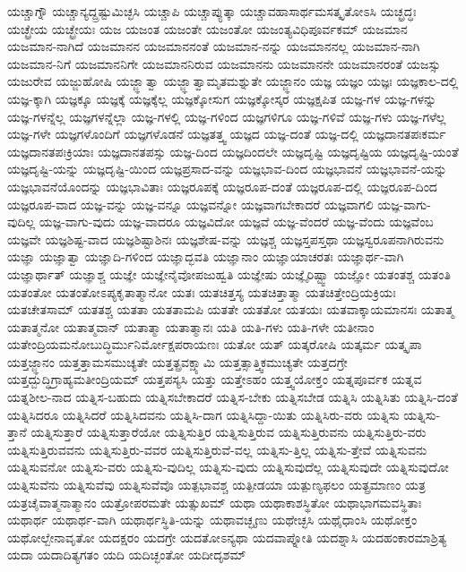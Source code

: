 {ಯಚ್ಚಾಗ್ನೌ
ಯಚ್ಚಾನ್ಯದ್ದ್ರಷ್ಟುಮಿಚ್ಛಸಿ
ಯಚ್ಚಾಪಿ
ಯಚ್ಚಾಪ್ಯುತ್ಕಾ
ಯಚ್ಚಾವಹಾಸಾರ್ಥಮಸತ್ಕೃತೋಽಸಿ
ಯಚ್ಛ್ರದ್ಧಃ
ಯಚ್ಛ್ರೇಯ
ಯಚ್ಛ್ರೇಯಃ
ಯಜ
ಯಜಂತ
ಯಜಂತೇ
ಯಜಂತೋ
ಯಜಂತ್ಯವಿಧಿಪೂರ್ವಕಮ್
ಯಜಮಾನ
ಯಜಮಾನ-ನಾಗಿದೆ
ಯಜಮಾನನ
ಯಜಮಾನನಂತೆ
ಯಜಮಾನ-ನನ್ನು
ಯಜಮಾನನಲ್ಲ
ಯಜಮಾನ-ನಾಗಿ
ಯಜಮಾನ-ನಿಗೆ
ಯಜಮಾನನಿಗೇ
ಯಜಮಾನನಿರುವ
ಯಜಮಾನನು
ಯಜಮಾನನೇ
ಯಜಮಾನರಂತೆ
ಯಜಸ್ಸು
ಯಜುರೇವ
ಯಜ್ಜುಹೋಷಿ
ಯಜ್ಜ್ಞಾತ್ವಾ
ಯಜ್ಜ್ಞಾತ್ವಾಮೃತಮಶ್ನುತೇ
ಯಜ್ಜ್ಞಾನಂ
ಯಜ್ಞ
ಯಜ್ಞಂ
ಯಜ್ಞಃ
ಯಜ್ಞಕಾಲ-ದಲ್ಲಿ
ಯಜ್ಞ-ಕ್ಕಾಗಿ
ಯಜ್ಞಕ್ಕೂ
ಯಜ್ಞಕ್ಕೆ
ಯಜ್ಞಕ್ಕೆಲ್ಲ
ಯಜ್ಞಕ್ಕೋಸುಗ
ಯಜ್ಞಕ್ಕೋಸ್ಕರ
ಯಜ್ಞಕ್ಷಪಿತ
ಯಜ್ಞ-ಗಳ
ಯಜ್ಞ-ಗಳನ್ನು
ಯಜ್ಞ-ಗಳನ್ನೆಲ್ಲ
ಯಜ್ಞಗಳನ್ನೆಲ್ಲಾ
ಯಜ್ಞ-ಗಳಲ್ಲಿ
ಯಜ್ಞ-ಗಳಿಂದ
ಯಜ್ಞಗಳಿಗೂ
ಯಜ್ಞ-ಗಳಿವೆ
ಯಜ್ಞ-ಗಳು
ಯಜ್ಞ-ಗಳೆಲ್ಲ
ಯಜ್ಞ-ಗಳೇ
ಯಜ್ಞಗಳೊಂದಿಗೆ
ಯಜ್ಞಗಳೊಡನೆ
ಯಜ್ಞತತ್ತ್ವ
ಯಜ್ಞದ
ಯಜ್ಞ-ದಂತೆ
ಯಜ್ಞ-ದಲ್ಲಿ
ಯಜ್ಞದಾನತಪಃಕರ್ಮ
ಯಜ್ಞದಾನತಪಃಕ್ರಿಯಾಃ
ಯಜ್ಞದಾನತಪಸ್ಸು
ಯಜ್ಞ-ದಿಂದ
ಯಜ್ಞದಿಂದಲೇ
ಯಜ್ಞದೃಷ್ಟಿ
ಯಜ್ಞದೃಷ್ಟಿಯ
ಯಜ್ಞದೃಷ್ಟಿ-ಯಂತೆ
ಯಜ್ಞದೃಷ್ಟಿ-ಯನ್ನು
ಯಜ್ಞದೃಷ್ಟಿ-ಯಿಂದ
ಯಜ್ಞಪ್ರಸಾದ-ವನ್ನು
ಯಜ್ಞಭಾವ-ದಿಂದ
ಯಜ್ಞಭಾವನೆ
ಯಜ್ಞಭಾವನೆ-ಯನ್ನು
ಯಜ್ಞಭಾವನೆಯೊಂದನ್ನು
ಯಜ್ಞಭಾವಿತಾಃ
ಯಜ್ಞರೂಪಕ್ಕೆ
ಯಜ್ಞರೂಪ-ದಂತೆ
ಯಜ್ಞರೂಪ-ದಲ್ಲಿ
ಯಜ್ಞರೂಪ-ದಿಂದ
ಯಜ್ಞರೂಪ-ವಾದ
ಯಜ್ಞ-ವನ್ನು
ಯಜ್ಞ-ವನ್ನೂ
ಯಜ್ಞವನ್ನೋ
ಯಜ್ಞವಾಗಬೇಕಾದರೆ
ಯಜ್ಞವಾಗಲಿ
ಯಜ್ಞ-ವಾಗು-ವುದಿಲ್ಲ
ಯಜ್ಞ-ವಾಗು-ವುದು
ಯಜ್ಞ-ವಾದರೂ
ಯಜ್ಞವಿದೋ
ಯಜ್ಞವೆ
ಯಜ್ಞ-ವೆಂದರೆ
ಯಜ್ಞ-ವೆಂದು
ಯಜ್ಞವೆಂಬ
ಯಜ್ಞವೇ
ಯಜ್ಞಶಿಷ್ಟ-ವಾದ
ಯಜ್ಞಶಿಷ್ಟಾಶಿನಃ
ಯಜ್ಞಶೇಷ-ವನ್ನು
ಯಜ್ಞಶ್ಚ
ಯಜ್ಞಸ್ತಪಸ್ತಥಾ
ಯಜ್ಞಸ್ವರೂಪನಾಗಿರುವನು
ಯಜ್ಞಾ
ಯಜ್ಞಾತ್ವಾ
ಯಜ್ಞಾದಿ-ಗಳಿಂದ
ಯಜ್ಞಾದ್ಭವತಿ
ಯಜ್ಞಾನಾಂ
ಯಜ್ಞಾಯಾಚರತಃ
ಯಜ್ಞಾರ್ಥ-ವಾಗಿ
ಯಜ್ಞಾರ್ಥಾತ್
ಯಜ್ಞಾಶ್ಚ
ಯಜ್ಞೇ
ಯಜ್ಞೇನೈವೋಪಜುಹ್ವತಿ
ಯಜ್ಞೇಷು
ಯಜ್ಞೈರಿಷ್ಟ್ವಾ
ಯಜ್ಞೋ
ಯತಂತಶ್ಚ
ಯತಂತಿ
ಯತಂತೋ
ಯತಂತೋಽಪ್ಯಕೃತಾತ್ಮಾನೋ
ಯತಃ
ಯತಚಿತ್ತಸ್ಯ
ಯತಚಿತ್ತಾತ್ಮಾ
ಯತಚಿತ್ತೇಂದ್ರಿಯಕ್ರಿಯಃ
ಯತಚೇತಸಾಮ್
ಯತತಶ್ಚ
ಯತತಾ
ಯತತಾಮಪಿ
ಯತತೇ
ಯತತೋ
ಯತಯಃ
ಯತವಾಕ್ಕಾಯಮಾನಸಃ
ಯತಾತ್ಮ
ಯತಾತ್ಮನೋ
ಯತಾತ್ಮವಾನ್
ಯತಾತ್ಮಾ
ಯತಾತ್ಮಾನಃ
ಯತಿ
ಯತಿ-ಗಳು
ಯತಿ-ಗಳೇ
ಯತೀನಾಂ
ಯತೇಂದ್ರಿಯಮನೋಬುದ್ಧಿರ್ಮುನಿರ್ಮೋಕ್ಷಪರಾಯಣಃ
ಯತೋ
ಯತ್
ಯತ್ಕರೋಷಿ
ಯತ್ಕರ್ಮ
ಯತ್ಕೃಪಾ
ಯತ್ತಜ್ಜ್ಞಾನಂ
ಯತ್ತತ್ತಾಮಸಮುಚ್ಯತೇ
ಯತ್ತತ್ಪ್ರವಕ್ಷ್ಯಾಮಿ
ಯತ್ತತ್ಸಾತ್ತ್ವಿಕಮುಚ್ಯತೇ
ಯತ್ತದಗ್ರೇ
ಯತ್ತದ್ಬುದ್ಧಿಗ್ರಾಹ್ಯಮತೀಂದ್ರಿಯಮ್
ಯತ್ತಪಸ್ಯಸಿ
ಯತ್ತು
ಯತ್ತೇಽಹಂ
ಯತ್ತ್ವಯೋಕ್ತಂ
ಯತ್ನಪೂರ್ವಕ
ಯತ್ನವ
ಯತ್ನಶೀಲ-ನಾದ
ಯತ್ನಿಸ-ಬಹುದು
ಯತ್ನಿಸಬೇಕಾದರೆ
ಯತ್ನಿಸ-ಬೇಕು
ಯತ್ನಿಸಬೇಡ
ಯತ್ನಿಸಿ
ಯತ್ನಿಸಿತು
ಯತ್ನಿಸಿ-ದಂತೆ
ಯತ್ನಿಸಿದರೂ
ಯತ್ನಿಸಿದರೆ
ಯತ್ನಿಸಿದವನು
ಯತ್ನಿಸಿ-ದಾಗ
ಯತ್ನಿಸಿದ್ದಾ-ಯಿತು
ಯತ್ನಿಸಿರು-ವರು
ಯತ್ನಿಸು
ಯತ್ನಿಸು-ತ್ತಾನೆ
ಯತ್ನಿಸುತ್ತಾರೆ
ಯತ್ನಿಸುತ್ತಾರೆಯೋ
ಯತ್ನಿಸುತ್ತಿರ
ಯತ್ನಿಸುತ್ತಿರುವ
ಯತ್ನಿಸುತ್ತಿರುವನು
ಯತ್ನಿಸುತ್ತಿರು-ವರು
ಯತ್ನಿಸುತ್ತಿರುವವನು
ಯತ್ನಿಸುತ್ತಿರು-ವವರ
ಯತ್ನಿಸುತ್ತಿರುವೆ-ವಲ್ಲ
ಯತ್ನಿಸು-ತ್ತಿಲ್ಲ
ಯತ್ನಿಸು-ತ್ತೇವೆ
ಯತ್ನಿಸುವನು
ಯತ್ನಿಸುವನೋ
ಯತ್ನಿಸು-ವರು
ಯತ್ನಿಸು-ವುದಿಲ್ಲ
ಯತ್ನಿಸು-ವುದು
ಯತ್ನಿಸುವುದೆಲ್ಲ
ಯತ್ನಿಸುವುದೇ
ಯತ್ನಿಸುವುದೋ
ಯತ್ನಿಸುವೆನು
ಯತ್ನಿಸುವೆವು
ಯತ್ನಿಸುವೆವೊ
ಯತ್ಪಭಾವಶ್ಚ
ಯತ್ಪೀಡಯಾ
ಯತ್ಪುಣ್ಯಫಲಂ
ಯತ್ಪ್ರಮಾಣಂ
ಯತ್ರ
ಯತ್ರಚೈವಾತ್ಮನಾತ್ಮಾನಂ
ಯತ್ರೋಪರಮತೇ
ಯತ್ಸುಖಮ್
ಯಥಾ
ಯಥಾಕಾಶಸ್ಥಿತೋ
ಯಥಾಭಾಗಮವಸ್ಥಿತಾಃ
ಯಥಾರ್ಥ
ಯಥಾರ್ಥ-ವಾಗಿ
ಯಥಾರ್ಥಸ್ಥಿತಿ-ಯನ್ನು
ಯಥಾವಚ್ಛೃಣು
ಯಥೇಚ್ಛಸಿ
ಯಥೈಧಾಂಸಿ
ಯಥೋಕ್ತಂ
ಯಥೋಲ್ಬೇನಾವೃತೋ
ಯದಕ್ಷರಂ
ಯದಗ್ರೇ
ಯದತೋಽನ್ಯಥಾ
ಯದವಾಪ್ನೋತಿ
ಯದಶ್ನಾಸಿ
ಯದಹಂಕಾರಮಾಶ್ರಿತ್ಯ
ಯದಾ
ಯದಾದಿತ್ಯಗತಂ
ಯದಿ
ಯದಿಚ್ಛಂತೋ
ಯದೀದೃಶಮ್
}

